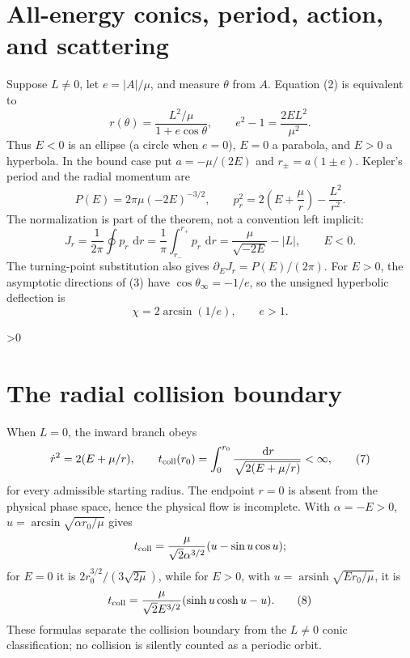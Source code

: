 \documentclass[9pt]{extarticle}
\newcommand{\dd}{\,\mathrm d}
\begin{document}
\section{All-energy conics, period, action, and scattering}
Suppose \(L\ne0\), let \(e=|A|/\mu\), and measure \(\theta\) from \(A\).
Equation (2) is equivalent to
\begin{equation}
 r(\theta)=\frac{L^2/\mu}{1+e\cos\theta},\qquad
 e^2-1=\frac{2EL^2}{\mu^2}.                                \tag{3}
\end{equation}
Thus \(E<0\) is an ellipse (a circle when \(e=0\)), \(E=0\) a parabola, and
\(E>0\) a hyperbola.  In the bound case put \(a=-\mu/(2E)\) and
\(r_\pm=a(1\pm e)\).  Kepler's period and the radial momentum are
\begin{equation}
 P(E)=2\pi\mu(-2E)^{-3/2},\qquad
 p_r^2=2\left(E+\frac\mu r\right)-\frac{L^2}{r^2}.          \tag{4}
\end{equation}
The normalization is part of the theorem, not a convention left implicit:
\begin{equation}
 J_r=\frac{1}{2\pi}\oint p_r\,\dd r
 =\frac{1}{\pi}\int_{r_-}^{r_+}p_r\,\dd r
 =\frac{\mu}{\sqrt{-2E}}-|L|,\qquad E<0 .                \tag{5}
\end{equation}
The turning-point substitution also gives \(\partial_EJ_r=P(E)/(2\pi)\).
For \(E>0\), the asymptotic directions of (3) have \(\cos\theta_\infty=-1/e\),
so the unsigned hyperbolic deflection is
\begin{equation}
 \chi=2\arcsin(1/e),\qquad e>1 .                          \tag{6}
\end{equation}

\ifnum\CRevisionRound>0
\section{The radial collision boundary}
When \(L=0\), the inward branch obeys
\begin{equation}
 \dot r^2=2(E+\mu/r),\qquad
 t_{\rm coll}(r_0)=\int_0^{r_0}\frac{\dd r}{\sqrt{2(E+\mu/r)}}<\infty, \tag{7}
\end{equation}
for every admissible starting radius.  The endpoint \(r=0\) is absent from the
physical phase space, hence the physical flow is incomplete.  With
\(\alpha=-E>0\), \(u=\arcsin\sqrt{\alpha r_0/\mu}\) gives
\[
 t_{\rm coll}=\frac{\mu}{\sqrt2\alpha^{3/2}}
 (u-\sin u\cos u);
\]
for \(E=0\) it is \(2r_0^{3/2}/(3\sqrt{2\mu})\), while for \(E>0\), with
\(u=\operatorname{arsinh}\sqrt{Er_0/\mu}\), it is
\[
 t_{\rm coll}=\frac{\mu}{\sqrt2E^{3/2}}
 (\sinh u\cosh u-u).                                       \tag{8}
\]
These formulas separate the collision boundary from the \(L\ne0\) conic
classification; no collision is silently counted as a periodic orbit.
\fi
\end{document}
